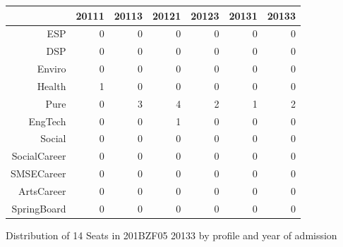 \documentclass{article}\usepackage[]{graphicx}\usepackage[]{color}
\begin{document}
\begin{figure}[H]
\centering
\begin{tabular}{rrrrrrr}
  \hline
 & 20111 & 20113 & 20121 & 20123 & 20131 & 20133 \\ 
  \hline
ESP &   0 &   0 &   0 &   0 &   0 &   0 \\ 
  DSP &   0 &   0 &   0 &   0 &   0 &   0 \\ 
  Enviro &   0 &   0 &   0 &   0 &   0 &   0 \\ 
  Health &   1 &   0 &   0 &   0 &   0 &   0 \\ 
  Pure &   0 &   3 &   4 &   2 &   1 &   2 \\ 
  EngTech &   0 &   0 &   1 &   0 &   0 &   0 \\ 
  Social &   0 &   0 &   0 &   0 &   0 &   0 \\ 
  SocialCareer &   0 &   0 &   0 &   0 &   0 &   0 \\ 
  SMSECareer &   0 &   0 &   0 &   0 &   0 &   0 \\ 
  ArtsCareer &   0 &   0 &   0 &   0 &   0 &   0 \\ 
  SpringBoard &   0 &   0 &   0 &   0 &   0 &   0 \\ 
   \hline
\end{tabular}
\caption{Distribution of 14 Seats in 201BZF05 20133 by profile and year of admission} 
\end{figure}
\end{document}
